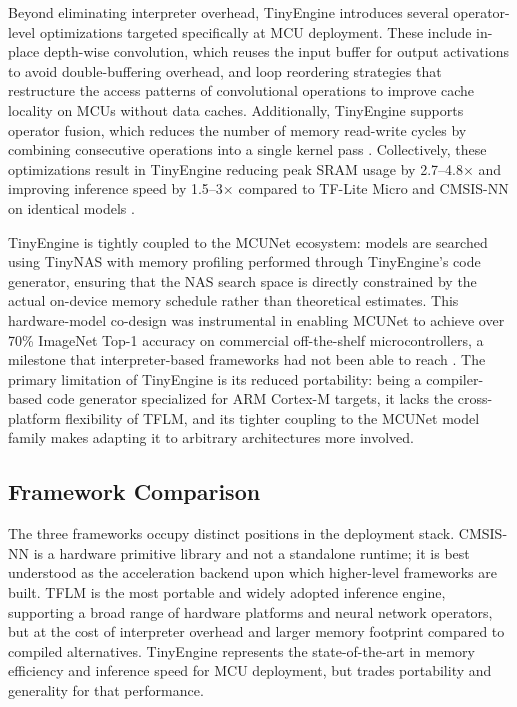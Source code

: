 \documentclass[conference]{IEEEtran}
\begin{document}
	Beyond eliminating interpreter overhead, TinyEngine introduces several operator-level optimizations targeted specifically at MCU deployment. These include in-place depth-wise convolution, which reuses the input buffer for output activations to avoid double-buffering overhead, and loop reordering strategies that restructure the access patterns of convolutional operations to improve cache locality on MCUs without data caches. Additionally, TinyEngine supports operator fusion, which reduces the number of memory read-write cycles by combining consecutive operations into a single kernel pass \cite{lin2023}. Collectively, these optimizations result in TinyEngine reducing peak SRAM usage by 2.7--4.8$\times$ and improving inference speed by 1.5--3$\times$ compared to TF-Lite Micro and CMSIS-NN on identical models \cite{mcunet2020}.
	
	TinyEngine is tightly coupled to the MCUNet ecosystem: models are searched using TinyNAS with memory profiling performed through TinyEngine's code generator, ensuring that the NAS search space is directly constrained by the actual on-device memory schedule rather than theoretical estimates. This hardware-model co-design was instrumental in enabling MCUNet to achieve over 70\% ImageNet Top-1 accuracy on commercial off-the-shelf microcontrollers, a milestone that interpreter-based frameworks had not been able to reach \cite{mcunet2020}. The primary limitation of TinyEngine is its reduced portability: being a compiler-based code generator specialized for ARM Cortex-M targets, it lacks the cross-platform flexibility of TFLM, and its tighter coupling to the MCUNet model family makes adapting it to arbitrary architectures more involved.
	
	\subsection{Framework Comparison}
	
	The three frameworks occupy distinct positions in the deployment stack. CMSIS-NN is a hardware primitive library and not a standalone runtime; it is best understood as the acceleration backend upon which higher-level frameworks are built. TFLM is the most portable and widely adopted inference engine, supporting a broad range of hardware platforms and neural network operators, but at the cost of interpreter overhead and larger memory footprint compared to compiled alternatives. TinyEngine represents the state-of-the-art in memory efficiency and inference speed for MCU deployment, but trades portability and generality for that performance.
	
\end{document}
